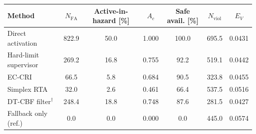 \begin{tabular}{lcccccc}
\toprule
Method & $N_{\mathrm{FA}}$ & Active-in-hazard [\%] & $A_c$ & Safe avail. [\%] & $N_{\mathrm{viol}}$ & $E_V$ \\
\midrule
Direct activation & 822.9 & 50.0 & 1.000 & 100.0 & 695.5 & 0.0431 \\
Hard-limit supervisor & 269.2 & 16.8 & 0.755 & 92.2 & 519.1 & 0.0442 \\
EC-CRI & 66.5 & 5.8 & 0.684 & 90.5 & 323.8 & 0.0455 \\
Simplex RTA & 32.0 & 2.6 & 0.461 & 66.4 & 537.5 & 0.0516 \\
DT-CBF filter$^{\dagger}$ & 248.4 & 18.8 & 0.748 & 87.6 & 281.5 & 0.0427 \\
Fallback only (ref.) & 0.0 & 0.0 & 0.000 & 0.0 & 445.0 & 0.0574 \\
\bottomrule
\end{tabular}